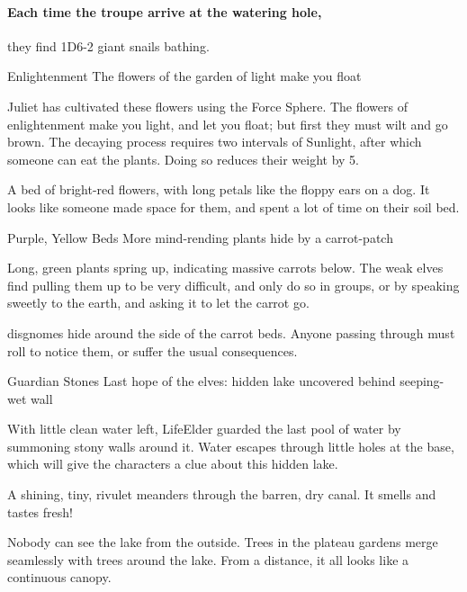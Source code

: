 \begin{multicols}{2}
\paragraph{Each time the troupe arrive at the watering hole,}
they find 1D6-2 giant snails bathing.


{Enlightenment}%
{The flowers of the garden of light make you float}%

Juliet has cultivated these flowers using the Force Sphere.
The flowers of enlightenment make you light, and let you float; but first they must wilt and go brown.
The decaying process requires two \glspl{interval} of Sunlight, after which someone can eat the plants.
Doing so reduces their \gls{weight} by 5.

\begin{boxtext}
  A bed of bright-red flowers, with long petals like the floppy ears on a dog.
  It looks like someone made space for them, and spent a lot of time on their soil bed.
\end{boxtext}

{Purple, Yellow Beds}%
{More mind-rending plants hide by a carrot-patch}%

Long, green plants spring up, indicating massive carrots below.
The weak elves find pulling them up to be very difficult, and only do so in groups, or by speaking sweetly to the earth, and asking it to let the carrot go.

\Glspl{disgnome} hide around the side of the carrot beds.
Anyone passing through must roll to notice them, or suffer the usual consequences.

{Guardian Stones}%
{Last hope of the elves: hidden lake uncovered behind seeping-wet wall}%

With little clean water left, \gls{LifeElder} guarded the last pool of water by summoning stony walls around it.
Water escapes through little holes at the base, which will give the characters a clue about this hidden lake.

\begin{boxtext}
  A shining, tiny, rivulet meanders through the barren, dry canal.
  It smells and tastes fresh!
\end{boxtext}

Nobody can see the lake from the outside.
Trees in the plateau gardens merge seamlessly with trees around the lake.
From a distance, it all looks like a continuous canopy.


\end{multicols}
